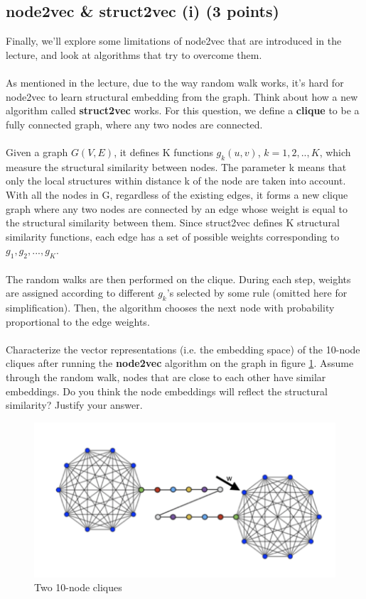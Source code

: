\documentclass{article}
\numberwithin{figure}{section}
\begin{document}
\subsection{node2vec \& struct2vec (i) (3 points)}
Finally, we’ll explore some limitations of node2vec that are introduced in the lecture, and look at algorithms that try to overcome them.\\
\\
As mentioned in the lecture, due to the way random walk works, it’s hard for node2vec to learn structural embedding from the graph. Think about how a new algorithm called \textbf{struct2vec} works. For this question, we define a \textbf{clique} to be a fully connected graph, where any two nodes are connected.\\
\\
Given a graph $G(V,E)$, it defines K functions $g_k(u,v)$, $k = 1,2,..,K$, which measure the structural similarity between nodes. The parameter k means that only the local structures within distance k of the node are taken into account.
With all the nodes in G, regardless of the existing edges, it forms a new clique graph where any two nodes are connected by an edge whose weight is equal to the structural similarity between them. Since struct2vec defines K structural similarity functions, each edge has a set of possible weights corresponding to $g_1, g_2,...,g_K$.\\
\\
The random walks are then performed on the clique. During each step, weights are assigned according to different $g_k$’s selected by some rule (omitted here for simplification). Then, the algorithm chooses the next node with probability proportional to the edge weights.\\
\\
Characterize the vector representations (i.e. the embedding space) of the 10-node cliques after running the \textbf{node2vec} algorithm on the graph in figure \ref{fig:10-node}. Assume through the random walk, nodes that are close to each other have similar embeddings. Do you think the node embeddings will reflect the structural similarity? Justify your answer.

\begin{figure}[!htb]
\centering
  \includegraphics[width=0.6\columnwidth]{CS224W_Homework1/fig5.png}
  \caption{Two 10-node cliques}
  \label{fig:10-node}
\end{figure}
\end{document}
